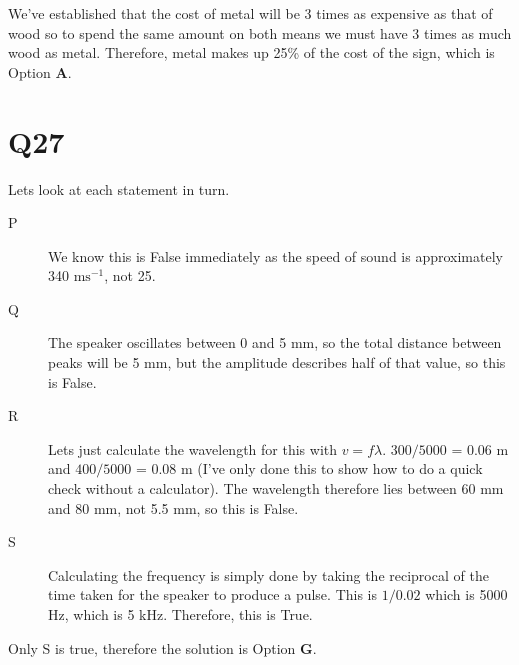 \documentclass[11pt]{article}
\begin{document}
We've established that the cost of metal will be 3 times as expensive as that of wood so to spend the same amount on both means we must have 3 times as much wood as metal.  Therefore, metal makes up 25\% of the cost of the sign, which is Option \textbf{A}.

\section*{Q27}
Lets look at each statement in turn.
\begin{description}
\item[P] We know this is False immediately as the speed of sound is approximately 340 $\mathrm{ms^{-1}}$, not 25.
\item[Q] The speaker oscillates between 0 and 5 mm, so the total distance between peaks will be 5 mm, but the amplitude describes half of that value, so this is False.
\item[R] Lets just calculate the wavelength for this with $v=f\lambda$.  $300/5000$ = 0.06 m and $400/5000$ = 0.08 m (I've only done this to show how to do a quick check without a calculator).  The wavelength therefore lies between 60 mm and 80 mm, not 5.5 mm, so this is False.
\item[S] Calculating the frequency is simply done by taking the reciprocal of the time taken for the speaker to produce a pulse.  This is $1/0.02$ which is 5000 Hz, which is 5 kHz.  Therefore, this is True.
\end{description}
Only S is true, therefore the solution is Option \textbf{G}.
\end{document}
